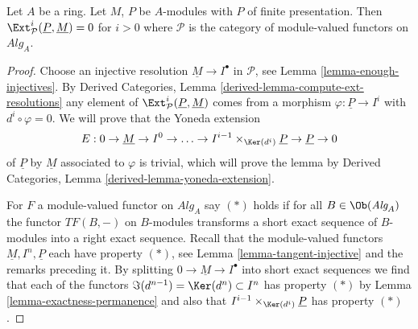 %
\begin{lemma}
\label{lemma-ext-group-zero-key}
Let $A$ be a ring. Let $M$, $P$ be $A$-modules with $P$ of finite
presentation. Then
$\Ext^i_\mathcal{P}(\underline{P}, \underline{M}) = 0$
for $i > 0$ where $\mathcal{P}$ is the category of module-valued
functors on $\textit{Alg}_A$.
\end{lemma}

\begin{proof}
Choose an injective resolution $\underline{M} \to I^\bullet$ in
$\mathcal{P}$, see
Lemma \ref{lemma-enough-injectives}.
By
Derived Categories, Lemma \ref{derived-lemma-compute-ext-resolutions}
any element of $\Ext^i_\mathcal{P}(\underline{P}, \underline{M})$
comes from a morphism $\varphi : \underline{P} \to I^i$ with
$d^i \circ \varphi = 0$. We will prove that the
Yoneda extension
$$
E : 0 \to \underline{M} \to I^0 \to \ldots \to
I^{i - 1} \times_{\Ker(d^i)} \underline{P} \to \underline{P} \to 0
$$
of $\underline{P}$ by $\underline{M}$
associated to $\varphi$ is trivial, which will prove the lemma by
Derived Categories, Lemma \ref{derived-lemma-yoneda-extension}.

\medskip\noindent
For $F$ a module-valued functor on $\textit{Alg}_A$
say $(*)$ holds if for all $B \in \Ob(\textit{Alg}_A)$ the
functor $TF(B, -)$ on $B$-modules transforms a short exact sequence
of $B$-modules into a right exact sequence.
Recall that the module-valued functors $\underline{M}, I^n, \underline{P}$
each have property $(*)$, see
Lemma \ref{lemma-tangent-injective}
and the remarks preceding it.
By splitting $0 \to \underline{M} \to I^\bullet$ into short
exact sequences we find that each of the functors
$\Im(d^{n - 1}) = \Ker(d^n) \subset I^n$ has property $(*)$ by
Lemma \ref{lemma-exactness-permanence}
and also that $I^{i - 1} \times_{\Ker(d^i)} \underline{P}$ has property
$(*)$.


\end{proof}
